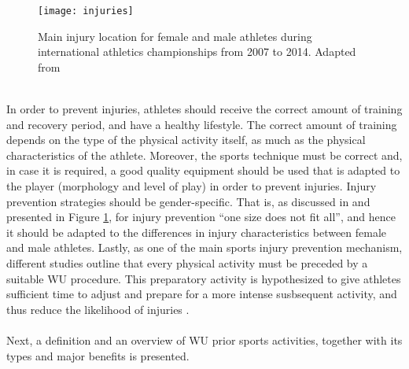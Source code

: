 \begin{figure}[h]
    \centering
    \texttt{[image: injuries]}
    \caption{Main injury location for female and male athletes during
international athletics championships from 2007 to 2014. Adapted from \cite{mayr2015prevention}}
    \label{fig:injuries}
\end{figure}\\
In order to prevent injuries, athletes should receive the correct amount of training and recovery period, and have a healthy lifestyle. The correct amount of training depends on the type of the physical activity itself, as much as the physical characteristics of the athlete. Moreover, the sports technique must be correct and, in case it is required, a good quality equipment should be used that is adapted to the player (morphology and level of play) in order to prevent injuries. Injury prevention strategies should be gender-specific. That is, as discussed in \cite{edouard2015sex} and presented in Figure \ref{fig:injuries}, for injury prevention ``one size does not fit all'', and hence it should be adapted to the differences in injury characteristics between female and male athletes. Lastly, as one of the main sports injury prevention mechanism, different studies outline that every physical activity must be preceded by a suitable WU procedure. This preparatory activity is hypothesized to give athletes sufficient time to adjust and prepare for a more intense susbsequent activity, and thus reduce the likelihood of injuries \cite{mayr2015prevention}.\\\\ Next, a definition and an overview of WU prior sports activities, together with its types and major benefits is presented.\pagebreak %
